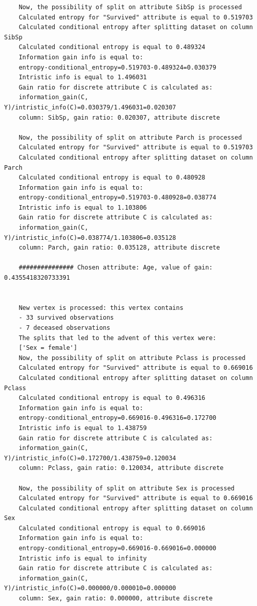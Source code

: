 \documentclass[12pt]{article}
\begin{document}
\begin{verbatim}
	Now, the possibility of split on attribute SibSp is processed
	Calculated entropy for "Survived" attribute is equal to 0.519703
	Calculated conditional entropy after splitting dataset on column SibSp
	Calculated conditional entropy is equal to 0.489324
	Information gain info is equal to:
	entropy-conditional_entropy=0.519703-0.489324=0.030379
	Intristic info is equal to 1.496031
	Gain ratio for discrete attribute C is calculated as:
	information_gain(C, Y)/intristic_info(C)=0.030379/1.496031=0.020307
	column: SibSp, gain ratio: 0.020307, attribute discrete
	
	Now, the possibility of split on attribute Parch is processed
	Calculated entropy for "Survived" attribute is equal to 0.519703
	Calculated conditional entropy after splitting dataset on column Parch
	Calculated conditional entropy is equal to 0.480928
	Information gain info is equal to:
	entropy-conditional_entropy=0.519703-0.480928=0.038774
	Intristic info is equal to 1.103806
	Gain ratio for discrete attribute C is calculated as:
	information_gain(C, Y)/intristic_info(C)=0.038774/1.103806=0.035128
	column: Parch, gain ratio: 0.035128, attribute discrete
	
	############### Chosen attribute: Age, value of gain: 0.4355418320733391
	
	
	New vertex is processed: this vertex contains
	- 33 survived observations
	- 7 deceased observations
	The splits that led to the advent of this vertex were:
	['Sex = female']
	Now, the possibility of split on attribute Pclass is processed
	Calculated entropy for "Survived" attribute is equal to 0.669016
	Calculated conditional entropy after splitting dataset on column Pclass
	Calculated conditional entropy is equal to 0.496316
	Information gain info is equal to:
	entropy-conditional_entropy=0.669016-0.496316=0.172700
	Intristic info is equal to 1.438759
	Gain ratio for discrete attribute C is calculated as:
	information_gain(C, Y)/intristic_info(C)=0.172700/1.438759=0.120034
	column: Pclass, gain ratio: 0.120034, attribute discrete
	
	Now, the possibility of split on attribute Sex is processed
	Calculated entropy for "Survived" attribute is equal to 0.669016
	Calculated conditional entropy after splitting dataset on column Sex
	Calculated conditional entropy is equal to 0.669016
	Information gain info is equal to:
	entropy-conditional_entropy=0.669016-0.669016=0.000000
	Intristic info is equal to infinity
	Gain ratio for discrete attribute C is calculated as:
	information_gain(C, Y)/intristic_info(C)=0.000000/0.000010=0.000000
	column: Sex, gain ratio: 0.000000, attribute discrete
	

\end{verbatim}
\end{document}
